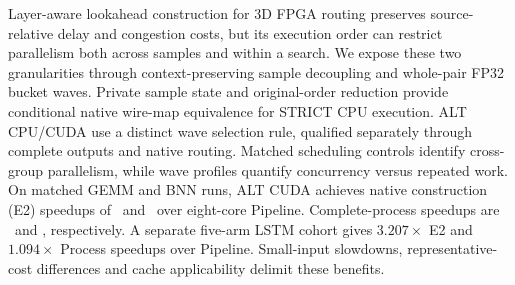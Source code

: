 Layer-aware lookahead construction for 3D FPGA routing preserves source-relative delay and congestion costs, but its execution order can restrict parallelism both across samples and within a search. We expose these two granularities through context-preserving sample decoupling and whole-pair FP32 bucket waves. Private sample state and original-order reduction provide conditional native wire-map equivalence for STRICT CPU execution. ALT CPU/CUDA use a distinct wave selection rule, qualified separately through complete outputs and native routing. Matched scheduling controls identify cross-group parallelism, while wave profiles quantify concurrency versus repeated work. On matched GEMM and BNN runs, ALT CUDA achieves native construction (E2) speedups of \GemmNewPipeBuild\ and \BnnNewPipeBuild\ over eight-core Pipeline. Complete-process speedups are \GemmNewPipeProc\ and \BnnNewPipeProc, respectively. A separate five-arm LSTM cohort gives $3.207\times$ E2 and $1.094\times$ Process speedups over Pipeline. Small-input slowdowns, representative-cost differences and cache applicability delimit these benefits.
